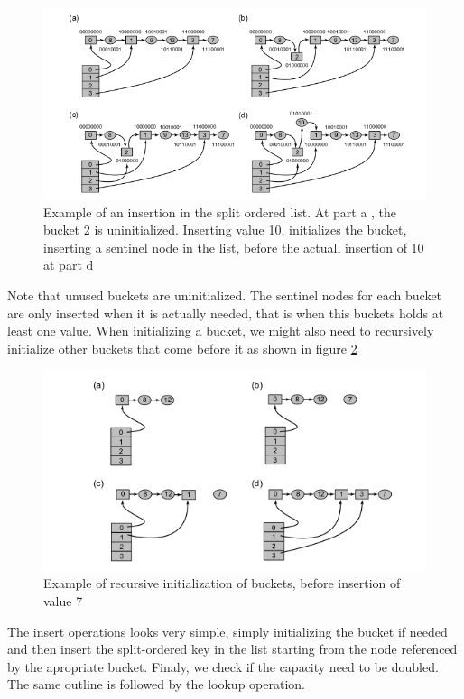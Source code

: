 \begin{figure}
 \centering
  \includegraphics[scale=0.5]{split_ordered_2.png}
\caption{Example of an insertion in the split ordered list. At part a , the bucket 2 is uninitialized. Inserting value 10, initializes the bucket, inserting a sentinel node in the list, before the actuall insertion of 10 at part d}
\label{split_ordered_2}
\end{figure}

Note that unused buckets are uninitialized. The sentinel nodes for each bucket are only inserted when it is actually needed, that is when this buckets holds at least one value. When initializing a bucket, we might also need to recursively initialize other buckets that come before it as shown in figure \ref{split_ordered_3}

\begin{figure}
 \centering
  \includegraphics[scale=0.5]{split_ordered_3.png}
\caption{Example of recursive initialization of buckets, before insertion of value 7}
\label{split_ordered_3}
\end{figure}

The insert operations looks very simple, simply initializing the bucket if needed and then insert the split-ordered key in the list starting from the node referenced by the apropriate bucket. Finaly, we check if the capacity need to be doubled. The same outline is followed by the lookup operation.

